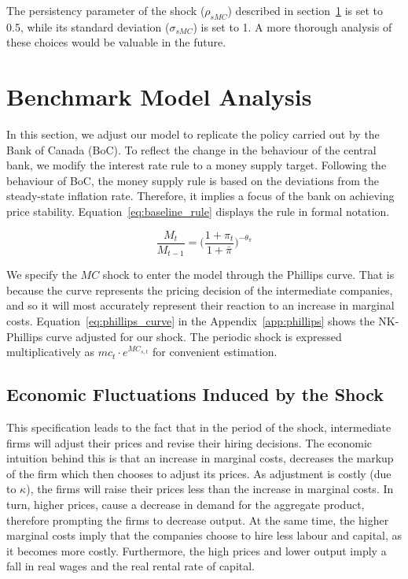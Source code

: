 \documentclass[12pt]{article}
\begin{document}
The persistency parameter of the shock ($\rho_{sMC}$) described in section~\ref{s:benchmark_model} is set to 0.5, while its standard deviation ($\sigma_{sMC}$) is set to 1. A more thorough analysis of these choices would be valuable in the future.

\newpage
\section{Benchmark Model Analysis}\label{s:benchmark_model}

In this section, we adjust our model to replicate the policy carried out by the Bank of Canada (BoC). To reflect the change in the behaviour of the central bank, we modify the interest rate rule to a money supply target. Following the behaviour of BoC, the money supply rule is based on the deviations from the steady-state inflation rate. Therefore, it implies a focus of the bank on achieving price stability. Equation~\ref{eq:baseline_rule} displays the rule in formal notation.


\begin{equation}\label{eq:baseline_rule}
    \frac{M_t}{M_{t-1}} = \Big(\frac{1+\pi_{t}}{1+ \bar \pi}\Big)^{-\theta_{\pi}}
\end{equation}

We specify the $MC$ shock to enter the model through the Phillips curve. That is because the curve represents the pricing decision of the intermediate companies, and so it will most accurately represent their reaction to an increase in marginal costs. Equation~\ref{eq:phillips_curve} in the Appendix~\ref{app:phillips} shows the NK-Phillips curve adjusted for our shock. The periodic shock is expressed multiplicatively as $mc_t \cdot e^{MC_{s, t}}$ for convenient estimation.

\subsection*{Economic Fluctuations Induced by the Shock}

This specification leads to the fact that in the period of the shock, intermediate firms will adjust their prices and revise their hiring decisions. The economic intuition behind this is that an increase in marginal costs, decreases the markup of the firm which then chooses to adjust its prices. As adjustment is costly (due to $\kappa$), the firms will raise their prices less than the increase in marginal costs. In turn, higher prices, cause a decrease in demand for the aggregate product, therefore prompting the firms to decrease output. At the same time, the higher marginal costs imply that the companies choose to hire less labour and capital, as it becomes more costly. Furthermore, the high prices and lower output imply a fall in real wages and the real rental rate of capital.
\end{document}
